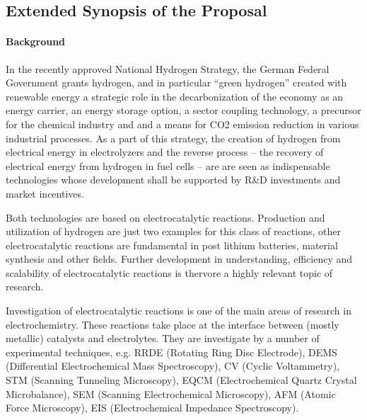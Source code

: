 \documentclass[a4paper,10pt]{article}
\begin{document}
\insertProjectHeader
{}


\subsection*{Extended Synopsis of the Proposal}

\paragraph{Background}

In  the  recently  approved  National Hydrogen  Strategy,  the  German
Federal  Government   grants  hydrogen,  and  in   particular  ``green
hydrogen''  created with  renewable  energy a  strategic  role in  the
decarbonization of the economy as an energy carrier, an energy storage
option, a  sector coupling  technology, a  precursor for  the chemical
industry  and  and a  means  for  CO2  emission reduction  in  various
industrial  processes. As  a part  of this  strategy, the  creation of
hydrogen  from  electrical energy  in  electrolyzers  and the  reverse
process --  the recovery  of electrical energy  from hydrogen  in fuel
cells -- are are seen  as indispensable technologies whose development
shall be  supported by  R\&D investments  and market  incentives.

Both technologies are based  on electrocatalytic reactions. Production
and utilization  of hydrogen are just  two examples for this  class of
reactions, other  electrocatalytic reactions  are fundamental  in post
lithium  batteries,  material  synthesis  and  other  fields.  Further
development   in   understanding,   efficiency  and   scalability   of
electrocatalytic reactions is thervore a highly relevant topic of research.



Investigation of electrocatalytic  reactions is one of  the main areas
of research  in electrochemistry.  These  reactions take place  at the
interface between  (mostly metallic)  catalysts and  electrolytes.
They  are investigate  by a  number of  experimental techniques,  e.g.
RRDE    (Rotating   Ring    Disc   Electrode),    DEMS   (Differential
Electrochemical  Mass  Spectroscopy),  CV  (Cyclic  Voltammetry),  STM
(Scanning Tunneling Microscopy),  EQCM (Electrochemical Quartz Crystal
Microbalance), SEM (Scanning  Electrochemical Microscopy), AFM (Atomic
Force Microscopy), EIS (Electrochemical Impedance Spectroscopy).
\end{document}
